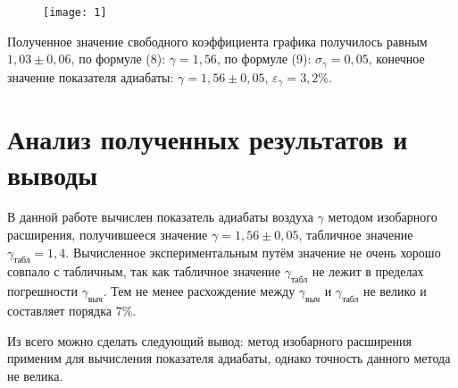 \documentclass[a4paper,14pt]{article}
\begin{document}
\begin{center}
\begin{figure}[h!]
\texttt{[image: 1]}
\label{1}
\end{figure} 
\end{center}

Полученное значение свободного коэффициента графика получилось равным $1,03 \pm 0,06$, по формуле (8): $\gamma = 1,56$, по формуле (9): $\sigma_{\gamma} = 0,05$, конечное значение показателя адиабаты: $\gamma = 1,56 \pm 0,05$, $\varepsilon_{\gamma} = 3,2 \%$.

\section{Анализ полученных результатов и выводы}
В данной работе вычислен показатель адиабаты воздуха $\gamma$ методом изобарного расширения, получившееся значение $\gamma = 1,56 \pm 0,05$, табличное значение $\gamma_{\text{табл}} = 1,4$. Вычисленное экспериментальным путём значение не очень хорошо совпало с табличным, так как табличное значение $\gamma_{\text{табл}}$ не лежит в пределах погрешности $\gamma_{\text{выч}}$. Тем не менее расхождение между $\gamma_{\text{выч}}$ и $\gamma_{\text{табл}}$ не велико и составляет порядка $7 \%$.

Из всего можно сделать следующий вывод: метод изобарного расширения применим для вычисления показателя адиабаты, однако точность данного метода не велика.
\end{document}
